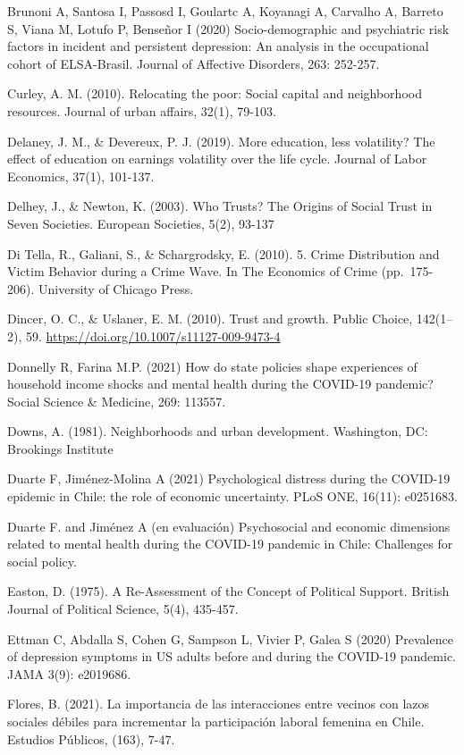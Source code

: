 \documentclass[
  12pt,
]{book}
\begin{document}
Brunoni A, Santosa I, Passosd I, Goulartc A, Koyanagi A, Carvalho A, Barreto S, Viana M, Lotufo P, Benseñor I (2020) Socio-demographic and psychiatric risk factors in incident and persistent depression: An analysis in the occupational cohort of ELSA-Brasil. Journal of Affective Disorders, 263: 252-257.

Curley, A. M. (2010). Relocating the poor: Social capital and neighborhood resources. Journal of urban affairs, 32(1), 79-103.

Delaney, J. M., \& Devereux, P. J. (2019). More education, less volatility? The effect of education on earnings volatility over the life cycle. Journal of Labor Economics, 37(1), 101-137.

Delhey, J., \& Newton, K. (2003). Who Trusts? The Origins of Social Trust in Seven Societies. European Societies, 5(2), 93-137

Di Tella, R., Galiani, S., \& Schargrodsky, E. (2010). 5. Crime Distribution and Victim Behavior during a Crime Wave. In The Economics of Crime (pp.~175-206). University of Chicago Press.

Dincer, O. C., \& Uslaner, E. M. (2010). Trust and growth. Public Choice, 142(1--2), 59. \url{https://doi.org/10.1007/s11127-009-9473-4}

Donnelly R, Farina M.P. (2021) How do state policies shape experiences of household income shocks and mental health during the COVID-19 pandemic? Social Science \& Medicine, 269: 113557.

Downs, A. (1981). Neighborhoods and urban development. Washington, DC: Brookings Institute

Duarte F, Jiménez-Molina A (2021) Psychological distress during the COVID-19 epidemic in Chile: the role of economic uncertainty. PLoS ONE, 16(11): e0251683.

Duarte F. and Jiménez A (en evaluación) Psychosocial and economic dimensions related to mental health during the COVID-19 pandemic in Chile: Challenges for social policy.

Easton, D. (1975). A Re-Assessment of the Concept of Political Support. British Journal of Political Science, 5(4), 435-457.

Ettman C, Abdalla S, Cohen G, Sampson L, Vivier P, Galea S (2020) Prevalence of depression symptoms in US adults before and during the COVID-19 pandemic. JAMA 3(9): e2019686.

Flores, B. (2021). La importancia de las interacciones entre vecinos con lazos sociales débiles para incrementar la participación laboral femenina en Chile. Estudios Públicos, (163), 7-47.
\end{document}
